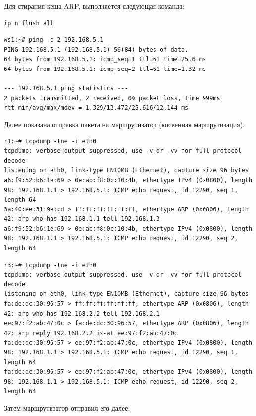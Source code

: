 \documentclass[a4paper,12pt]{article}
\begin{document}
Для стирания кеша ARP, выполняется следующая команда: 
\begin{Verbatim}
ip n flush all
\end{Verbatim}

\begin{Verbatim}
ws1:~# ping -c 2 192.168.5.1
PING 192.168.5.1 (192.168.5.1) 56(84) bytes of data.
64 bytes from 192.168.5.1: icmp_seq=1 ttl=61 time=25.6 ms
64 bytes from 192.168.5.1: icmp_seq=2 ttl=61 time=1.32 ms

--- 192.168.5.1 ping statistics ---
2 packets transmitted, 2 received, 0% packet loss, time 999ms
rtt min/avg/max/mdev = 1.329/13.472/25.616/12.144 ms
\end{Verbatim}

Далее показана отправка пакета на маршрутизатор (косвенная маршрутизация). 

\begin{Verbatim}
r1:~# tcpdump -tne -i eth0
tcpdump: verbose output suppressed, use -v or -vv for full protocol decode
listening on eth0, link-type EN10MB (Ethernet), capture size 96 bytes
a6:f9:52:b6:1e:69 > 0e:ab:f8:0c:10:4b, ethertype IPv4 (0x0800), length 98: 192.168.1.1 > 192.168.5.1: ICMP echo request, id 12290, seq 1, length 64
3a:40:ee:31:9e:cd > ff:ff:ff:ff:ff:ff, ethertype ARP (0x0806), length 42: arp who-has 192.168.1.1 tell 192.168.1.3
a6:f9:52:b6:1e:69 > 0e:ab:f8:0c:10:4b, ethertype IPv4 (0x0800), length 98: 192.168.1.1 > 192.168.5.1: ICMP echo request, id 12290, seq 2, length 64
\end{Verbatim}

\begin{Verbatim}
r3:~# tcpdump -tne -i eth0
tcpdump: verbose output suppressed, use -v or -vv for full protocol decode
listening on eth0, link-type EN10MB (Ethernet), capture size 96 bytes
fa:de:dc:30:96:57 > ff:ff:ff:ff:ff:ff, ethertype ARP (0x0806), length 42: arp who-has 192.168.2.2 tell 192.168.2.1
ee:97:f2:ab:47:0c > fa:de:dc:30:96:57, ethertype ARP (0x0806), length 42: arp reply 192.168.2.2 is-at ee:97:f2:ab:47:0c
fa:de:dc:30:96:57 > ee:97:f2:ab:47:0c, ethertype IPv4 (0x0800), length 98: 192.168.1.1 > 192.168.5.1: ICMP echo request, id 12290, seq 1, length 64
fa:de:dc:30:96:57 > ee:97:f2:ab:47:0c, ethertype IPv4 (0x0800), length 98: 192.168.1.1 > 192.168.5.1: ICMP echo request, id 12290, seq 2, length 64
\end{Verbatim}

Затем маршрутизатор отправил его далее.
\end{document}

